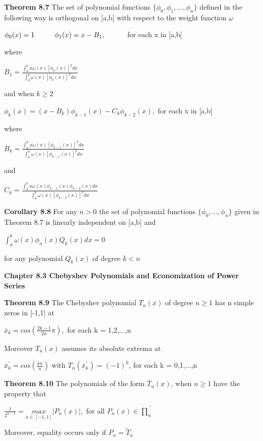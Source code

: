 \documentclass{article}
\begin{document}
\textbf {Theorem 8.7} The set of polynomial functions $\{ \phi_0, \phi_1, ... , \phi_n \}$ defined in the following way is orthogonal on [a,b] with respect to the weight function $\omega$
\begin{center}
$\phi_0 (x) = 1 \hspace*{1cm} \phi_1 (x) = x - B_1, \hspace*{1cm}$ for each x in [a,b]
\end{center}
where
\begin{center}
$B_1 = \frac {\int_{a}^{b} x \omega (x) [\phi_0 (x)]^2 dx} {\int_{a}^{b} \omega (x) [\phi_0 (x)]^2 dx}$
\end{center}
and when $k \geq 2$
\begin{center}
$\phi_k (x) = (x - B_k) \phi_{k-1} (x) - C_{k} \phi_{k-2}(x),$ \tab for each x in [a,b]
\end{center}
where
\begin{center}
$B_k = \frac{\int_{a}^{b} x \omega (x) [\phi_{k-1} (x)]^2 dx} {\int_{a}^{b} \omega (x) [\phi_{k-1} (x)]^2 dx}$
\end{center}
and
\begin{center}
$C_k = \frac{\int_{a}^{b} x \omega (x) \phi_{k-1} (x) \phi_{k-2}(x) dx} {\int_{a}^{b} \omega (x) [\phi_{k-2} (x)]^2 dx}$
\end{center}

\textbf {Corollary 8.8} For any $n > 0$ the set of polynomial functions $\{ \phi_0,..., \phi_n\}$ given in Theorem 8.7 is linearly independent on [a,b] and
\begin{center}
$\int_{a}^{b} \omega (x) \phi_{n} (x) Q_{k} (x) dx = 0$
\end{center}
for any polynomial $Q_k (x)$ of degree $k < n$

\textbf {Chapter 8.3 Chebyshev Polynomials and Economization of Power Series}

\textbf {Theorem 8.9} The Chebyshev polynomial $T_n(x)$ of degree $n \geq 1$ has n simple zeros in [-1,1] at 
\begin{center}
$\bar{x}_{k} = cos (\frac{2k-1}{2n} \pi),$ \tab for each k = 1,2,...,n
\end{center}
Moreover $T_n(x)$ assumes its absolute extrema at 
\begin{center}
$\bar{x}_{k}^{'} = cos (\frac{k \pi}{n})$ with $T_n(\bar{x}_{k}^{'}) = (-1)^{k}$, \tab for each k = 0,1,...,n
\end{center}

\textbf {Theorem 8.10} The polynomials of the form $\bar{T}_n(x)$, when $n \geq 1$ have the property that
\begin{center}
$\frac{1}{2^{n-1}} = \underset{x \in [-1,1]}{max} |P_n(x)|,$ \tab for all $P_n(x) \in {\tilde{\prod_n}}$
\end{center}
Moreover, equality occurs only if $P_n = {\tilde{T}_n}$
\end{document}
